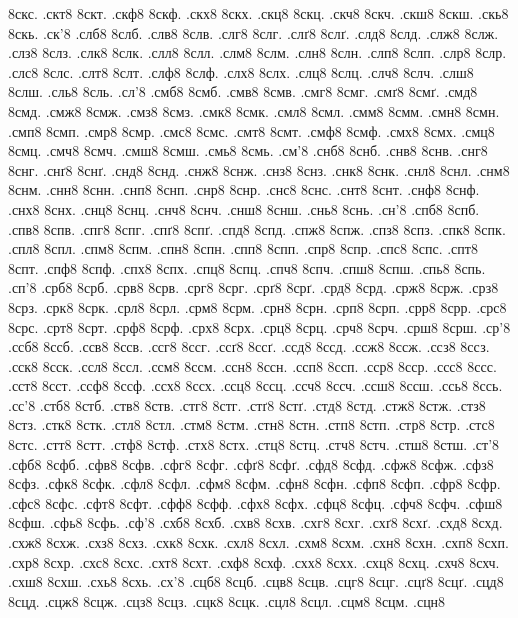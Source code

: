 {8скс.
.скт8
8скт.
.скф8
8скф.
.скх8
8скх.
.скц8
8скц.
.скч8
8скч.
.скш8
8скш.
.скь8
8скь.
.ск'8
.слб8
8слб.
.слв8
8слв.
.слг8
8слг.
.слґ8
8слґ.
.слд8
8слд.
.слж8
8слж.
.слз8
8слз.
.слк8
8слк.
.слл8
8слл.
.слм8
8слм.
.слн8
8слн.
.слп8
8слп.
.слр8
8слр.
.слс8
8слс.
.слт8
8слт.
.слф8
8слф.
.слх8
8слх.
.слц8
8слц.
.слч8
8слч.
.слш8
8слш.
.сль8
8сль.
.сл'8
.смб8
8смб.
.смв8
8смв.
.смг8
8смг.
.смґ8
8смґ.
.смд8
8смд.
.смж8
8смж.
.смз8
8смз.
.смк8
8смк.
.смл8
8смл.
.смм8
8смм.
.смн8
8смн.
.смп8
8смп.
.смр8
8смр.
.смс8
8смс.
.смт8
8смт.
.смф8
8смф.
.смх8
8смх.
.смц8
8смц.
.смч8
8смч.
.смш8
8смш.
.смь8
8смь.
.см'8
.снб8
8снб.
.снв8
8снв.
.снг8
8снг.
.снґ8
8снґ.
.снд8
8снд.
.снж8
8снж.
.снз8
8снз.
.снк8
8снк.
.снл8
8снл.
.снм8
8снм.
.снн8
8снн.
.снп8
8снп.
.снр8
8снр.
.снс8
8снс.
.снт8
8снт.
.снф8
8снф.
.снх8
8снх.
.снц8
8снц.
.снч8
8снч.
.снш8
8снш.
.снь8
8снь.
.сн'8
.спб8
8спб.
.спв8
8спв.
.спг8
8спг.
.спґ8
8спґ.
.спд8
8спд.
.спж8
8спж.
.спз8
8спз.
.спк8
8спк.
.спл8
8спл.
.спм8
8спм.
.спн8
8спн.
.спп8
8спп.
.спр8
8спр.
.спс8
8спс.
.спт8
8спт.
.спф8
8спф.
.спх8
8спх.
.спц8
8спц.
.спч8
8спч.
.спш8
8спш.
.спь8
8спь.
.сп'8
.срб8
8срб.
.срв8
8срв.
.срг8
8срг.
.срґ8
8срґ.
.срд8
8срд.
.срж8
8срж.
.срз8
8срз.
.срк8
8срк.
.срл8
8срл.
.срм8
8срм.
.срн8
8срн.
.срп8
8срп.
.срр8
8срр.
.срс8
8срс.
.срт8
8срт.
.срф8
8срф.
.срх8
8срх.
.срц8
8срц.
.срч8
8срч.
.срш8
8срш.
.ср'8
.ссб8
8ссб.
.ссв8
8ссв.
.ссг8
8ссг.
.ссґ8
8ссґ.
.ссд8
8ссд.
.ссж8
8ссж.
.ссз8
8ссз.
.сск8
8сск.
.ссл8
8ссл.
.ссм8
8ссм.
.ссн8
8ссн.
.ссп8
8ссп.
.сср8
8сср.
.ссс8
8ссс.
.сст8
8сст.
.ссф8
8ссф.
.ссх8
8ссх.
.ссц8
8ссц.
.ссч8
8ссч.
.ссш8
8ссш.
.ссь8
8ссь.
.сс'8
.стб8
8стб.
.ств8
8ств.
.стг8
8стг.
.стґ8
8стґ.
.стд8
8стд.
.стж8
8стж.
.стз8
8стз.
.стк8
8стк.
.стл8
8стл.
.стм8
8стм.
.стн8
8стн.
.стп8
8стп.
.стр8
8стр.
.стс8
8стс.
.стт8
8стт.
.стф8
8стф.
.стх8
8стх.
.стц8
8стц.
.стч8
8стч.
.стш8
8стш.
.ст'8
.сфб8
8сфб.
.сфв8
8сфв.
.сфг8
8сфг.
.сфґ8
8сфґ.
.сфд8
8сфд.
.сфж8
8сфж.
.сфз8
8сфз.
.сфк8
8сфк.
.сфл8
8сфл.
.сфм8
8сфм.
.сфн8
8сфн.
.сфп8
8сфп.
.сфр8
8сфр.
.сфс8
8сфс.
.сфт8
8сфт.
.сфф8
8сфф.
.сфх8
8сфх.
.сфц8
8сфц.
.сфч8
8сфч.
.сфш8
8сфш.
.сфь8
8сфь.
.сф'8
.схб8
8схб.
.схв8
8схв.
.схг8
8схг.
.схґ8
8схґ.
.схд8
8схд.
.схж8
8схж.
.схз8
8схз.
.схк8
8схк.
.схл8
8схл.
.схм8
8схм.
.схн8
8схн.
.схп8
8схп.
.схр8
8схр.
.схс8
8схс.
.схт8
8схт.
.схф8
8схф.
.схх8
8схх.
.схц8
8схц.
.схч8
8схч.
.схш8
8схш.
.схь8
8схь.
.сх'8
.сцб8
8сцб.
.сцв8
8сцв.
.сцг8
8сцг.
.сцґ8
8сцґ.
.сцд8
8сцд.
.сцж8
8сцж.
.сцз8
8сцз.
.сцк8
8сцк.
.сцл8
8сцл.
.сцм8
8сцм.
.сцн8
}
